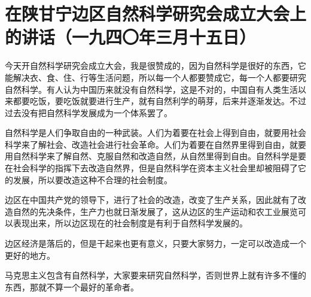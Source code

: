 \section[在陕甘宁边区自然科学研究会成立大会上的讲话（一九四〇年三月十五日）]{在陕甘宁边区自然科学研究会成立大会上的讲话（一九四〇年三月十五日）}


今天开自然科学研究会成立大会，我是很赞成的，因为自然科学是很好的东西，它能解决衣、食、住、行等生活问题，所以每一个人都要赞成它，每一个人都要研究自然科学。有人认为中国历来就没有自然科学，这是不对的，中国自有人类生活以来都要吃饭，要吃饭就要进行生产，就有自然利学的萌芽，后来并逐渐发达。不过过去没有把自然科学发展成为一个体系罢了。

自然科学是人们争取自由的一种武装。人们为着要在社会上得到自由，就要用社会科学来了解社会、改造社会进行社会革命。人们为着要在自然界里得到自由，就要用自然科学来了解自然、克服自然和改造自然，从自然里得到自由。自然科学是要在社会科学的指挥下去改造自然界，但是自然科学在资本主义社会里却被阻碍了它的发展，所以要改造这种不合理的社会制度。

边区在中国共产党的领导下，进行了社会的改造，改变了生产关系，因此就有了改造自然的先决条件，生产力也就日渐发展了，这从边区的生产运动和农工业展览可以表现出来，所以边区现在的社会制度是有利于自然科学发展的。

边区经济是落后的，但是干起来也更有意义，只要大家努力，一定可以改造成一个更好的地方。

马克思主义包含有自然科学，大家要来研究自然科学，否则世界上就有许多不懂的东西，那就不算一个最好的革命者。

